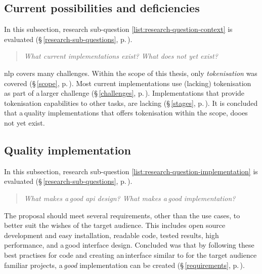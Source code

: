 \subsection{Current possibilities and
  deficiencies}\label{q-current-possibilities}

In this subsection, research sub-question \ref{list:research-question-context}
  is evaluated (§\,\ref{research-sub-questions},
  p.\,\pageref{list:research-question-implementation}).

\begin{quote}
  \textit{What current implementations exist? What does not yet exist?}
\end{quote}

\noindent\gls{nlp} covers many challenges.
Within the scope of this thesis, only \emph{tokenisation} was covered
  (§\,\ref{scope}, p.\,\pageref{scope}).
Most current implementations use (lacking) tokenisation as part of a\,larger
  challenge (§\,\ref{challenges}, p.\,\pageref{challenges}).
Implementations that provide tokenisation capabilities to other tasks,
  are lacking (§\,\ref{stages}, p.\,\pageref{stages}).
It is concluded that a\,quality implementations that offers tokenisation
  within the scope, dooes not yet exist.

\subsection{Quality implementation}\label{q-quality-implementation}

In this subsection, research sub-question
  \ref{list:research-question-implementation} is evaluated
  (§\,\ref{research-sub-questions},
  p.\,\pageref{list:research-question-implementation}).

\noindent\begin{quote}
  \textit{What makes a\,good \gls{api} design? What makes a\,good
    implementation?}
\end{quote}

The proposal should meet several requirements, other than the use cases,
  to better suit the wishes of the target audience.
This includes open source development and easy installation, readable code,
  tested results, high performance, and a\,good interface design.
Concluded was that by following these best practises for code and creating
  an\,interface similar to for the target audience familiar projects,
  a\,\emph{good} implementation can be created (§\,\ref{requirements},
  p.\,\pageref{requirements}).


